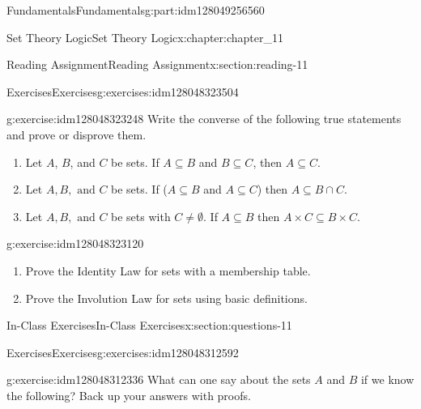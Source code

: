 \documentclass[oneside,10pt,]{book}
\numberwithin{equation}{section}
\begin{document}
\begin{partptx}{Fundamentals}{}{Fundamentals}{}{}{g:part:idm128049256560}
\begin{chapterptx}{Set Theory Logic}{}{Set Theory Logic}{}{}{x:chapter:chapter_11}
\begin{sectionptx}{Reading Assignment}{}{Reading Assignment}{}{}{x:section:reading-11}
\begin{exercises-subsection}{Exercises}{}{Exercises}{}{}{g:exercises:idm128048323504}
%
\begin{exercisegroup}
\begin{divisionexerciseeg}{1}{}{}{g:exercise:idm128048323248}%
Write the converse of the following true statements and prove or disprove them.%
\begin{enumerate}[label=(\alph*)]
\item{}Let \(A\), \(B\), and \(C\) be sets. If \(A\subseteq B\) and \(B\subseteq C\), then \(A\subseteq C\).%
\item{}Let \(A,B, \textrm{ and } C\) be sets. If (\(A\subseteq B\) and \(A\subseteq C\)) then \(A\subseteq B\cap C\).%
\item{}Let \(A,B, \textrm{ and } C\) be sets with \(C\neq \emptyset\). If \(A\subseteq B\) then \(A\times C \subseteq B\times C\).%
\end{enumerate}
%
\end{divisionexerciseeg}%
\begin{divisionexerciseeg}{2}{}{}{g:exercise:idm128048323120}%
%
\begin{enumerate}[label=(\alph*)]
\item{}Prove the Identity Law for sets  with a membership table.%
\item{}Prove the Involution Law  for sets using basic definitions.%
\end{enumerate}
%
\end{divisionexerciseeg}%
\end{exercisegroup}
\par\medskip\noindent
\end{exercises-subsection}
\end{sectionptx}
%
%
\typeout{************************************************}
\typeout{************************************************}
%
\begin{sectionptx}{In-Class Exercises}{}{In-Class Exercises}{}{}{x:section:questions-11}
%
%
%
\typeout{************************************************}
\typeout{************************************************}
%
\begin{exercises-subsection}{Exercises}{}{Exercises}{}{}{g:exercises:idm128048312592}
\par\medskip\noindent%
%
\begin{exercisegroup}
\begin{divisionexerciseeg}{1}{}{}{g:exercise:idm128048312336}%
What can one say about the sets \(A\) and \(B\) if we know the following?  Back up your answers with proofs.%

\end{divisionexerciseeg}
\end{exercisegroup}
\end{exercises-subsection}
\end{sectionptx}
\end{chapterptx}
\end{partptx}
\end{document}
